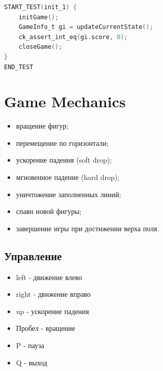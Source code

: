 \documentclass[12pt,a4paper]{article}
\begin{document}
\begin{lstlisting}[language=C]
START_TEST(init_1) {
    initGame();
    GameInfo_t gi = updateCurrentState();
    ck_assert_int_eq(gi.score, 0);
    closeGame();
}
END_TEST
\end{lstlisting}

\section{Game Mechanics}

\begin{itemize}
    \item вращение фигур;
    \item перемещение по горизонтали;
    \item ускорение падения (soft drop);
    \item мгновенное падение (hard drop);
    \item уничтожение заполненных линий;
    \item спавн новой фигуры;
    \item завершение игры при достижении верха поля.
\end{itemize}

\subsection{Управление}

\begin{itemize}
    \item left - движение влево
    \item right - движение вправо
    \item up - ускорение падения
    \item Пробел - вращение
    \item P - пауза
    \item Q - выход
\end{itemize}

\end{document}
